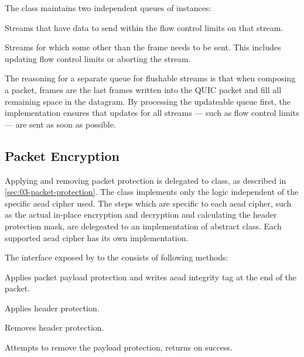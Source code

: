 The \StreamCollection{} class maintains two independent queues of \ManagedQuicStream{} instances:

\begin{itemize}

   Streams that have data to send within the flow control limits on that stream.

   Streams for which some other than the \STREAM{} frame needs to be sent. This
includes updating flow control limits or aborting the stream.

\end{itemize}

The reasoning for a separate queue for flushable streams is that when composing a packet, \STREAM{}
frames are the last frames written into the QUIC packet and fill all remaining space in the
datagram. By processing the updateable queue first, the implementation ensures that updates for all
streams --- such as flow control limits --- are sent as soon as possible.

\subsection{Packet Encryption}

Applying and removing packet protection is delegated to \CryptoSeal{} class, as described in
\autoref{sec:03-packet-protection}. The \CryptoSeal{} class implements only the logic independent of
the specific \gls{aead} cipher used. The steps which are specific to each \gls{aead} cipher, such as
the actual in-place encryption and decryption and calculating the header protection mask, are
delegeated to an implementation of \CryptoSealAlgorithm{} abstract class. Each supported \gls{aead}
cipher has its own \CryptoSealAlgorithm{} implementation.

The interface exposed by \CryptoSeal{} to the \ManagedQuicConnection{} consists of following
methods:

\begin{description}

     Applies packet payload protection and writes \gls{aead} integrity tag at the end of the packet.

     Applies
header protection.

     Removes
header protection.

     Attempts to remove the payload protection, returns  on success.

\end{description}

